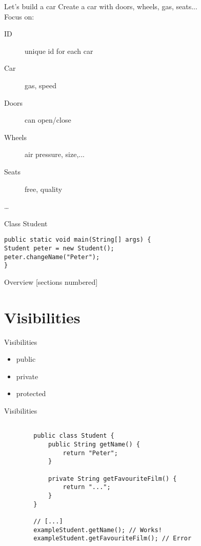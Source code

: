 \begin{frame}{Let's build a car}
Create a car with doors, wheels, gas, seats... \\
\vspace{1em}
Focus on:
\begin{description}
	\item[ID] unique id for each car
	\item[Car] gas, speed
	\item[Doors] can open/close
	\item[Wheels] air pressure, size,...
	\item[Seats] free, quality
	\item[\dots]
\end{description}
\end{frame}


\begin{frame}[fragile]{Class Student}
\begin{lstlisting}
public static void main(String[] args) {
Student peter = new Student();
peter.changeName("Peter");
}
\end{lstlisting}
\end{frame}

\begin{frame}
	\titlepage
\end{frame}
\begin{frame}{Overview}
	[sections numbered]
	\tableofcontents
\end{frame}

\section{Visibilities}
\begin{frame}[fragile]{Visibilities}
	\begin{itemize}
		\item public
		\item private
		\item protected
	\end{itemize}
\end{frame}
	
\begin{frame}[fragile]{Visibilities}

	\begin{lstlisting}
	
		public class Student {
			public String getName() {
				return "Peter";
			}
			
			private String getFavouriteFilm() {
				return "...";
			}
		}
	
		// [...]
		exampleStudent.getName(); // Works!
		exampleStudent.getFavouriteFilm(); // Error
	
	\end{lstlisting}
	
\end{frame}


